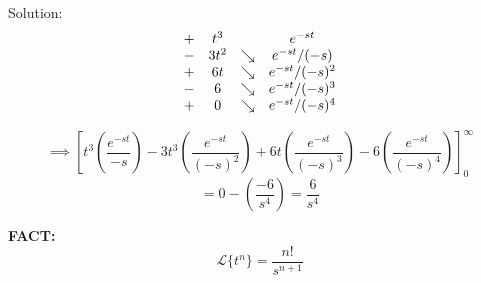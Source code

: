 \documentclass[12pt]{article}
\renewcommand{\L}[1]{\mathcal{L}\{#1\}}
\begin{document}
Solution:
\[\begin{array}{c c c c}
    + & t^3 & & e^{-st}\\
    - & 3t^2 & \searrow  & e^{-st} / (-s)\\
    + & 6t & \searrow  & e^{-st} / (-s)^2\\
    - & 6 & \searrow  & e^{-st} / (-s)^3\\
    + & 0 & \searrow  & e^{-st} / (-s)^4\\
\end{array}\]

\[\implies \left[t^3 \left(\frac{e^{-st}}{-s}\right) - 3t^3 \left(\frac{e^{-st}}{(-s)^2}\right) + 6t \left(\frac{e^{-st}}{(-s)^3}\right) - 6 \left(\frac{e^{-st}}{(-s)^4}\right)\right]_0^\infty\] 
\[= 0 - (\frac{-6}{s^4}) = \boxed{\frac{6}{s^4}}\]

\textbf{FACT:}
\[\boxed{\L{t^n} = \frac{n!}{s^{n+1}}}\]
\end{document}
